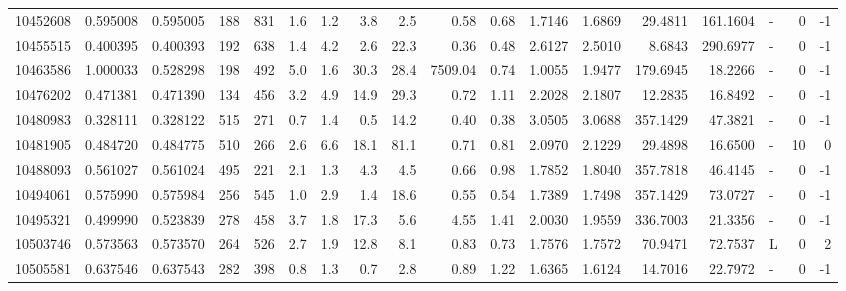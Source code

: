 \begin{tabular}{rrrrrrrrrrrrrrrlrr}
  10452608 & 0.595008 &   0.595005 &  188 &  831 &      1.6 &      1.2 &     3.8 &      2.5 &       0.58 &        0.68 &  1.7146 &  1.6869 &   29.4811 &  161.1604 &             - &        0 &         -1 \\
  10455515 & 0.400395 &   0.400393 &  192 &  638 &      1.4 &      4.2 &     2.6 &     22.3 &       0.36 &        0.48 &  2.6127 &  2.5010 &    8.6843 &  290.6977 &             - &        0 &         -1 \\
  10463586 & 1.000033 &   0.528298 &  198 &  492 &      5.0 &      1.6 &    30.3 &     28.4 &    7509.04 &        0.74 &  1.0055 &  1.9477 &  179.6945 &   18.2266 &             - &        0 &         -1 \\
  10476202 & 0.471381 &   0.471390 &  134 &  456 &      3.2 &      4.9 &    14.9 &     29.3 &       0.72 &        1.11 &  2.2028 &  2.1807 &   12.2835 &   16.8492 &             - &        0 &         -1 \\
  10480983 & 0.328111 &   0.328122 &  515 &  271 &      0.7 &      1.4 &     0.5 &     14.2 &       0.40 &        0.38 &  3.0505 &  3.0688 &  357.1429 &   47.3821 &             - &        0 &         -1 \\
  10481905 & 0.484720 &   0.484775 &  510 &  266 &      2.6 &      6.6 &    18.1 &     81.1 &       0.71 &        0.81 &  2.0970 &  2.1229 &   29.4898 &   16.6500 &             - &       10 &          0 \\
  10488093 & 0.561027 &   0.561024 &  495 &  221 &      2.1 &      1.3 &     4.3 &      4.5 &       0.66 &        0.98 &  1.7852 &  1.8040 &  357.7818 &   46.4145 &             - &        0 &         -1 \\
  10494061 & 0.575990 &   0.575984 &  256 &  545 &      1.0 &      2.9 &     1.4 &     18.6 &       0.55 &        0.54 &  1.7389 &  1.7498 &  357.1429 &   73.0727 &             - &        0 &         -1 \\
  10495321 & 0.499990 &   0.523839 &  278 &  458 &      3.7 &      1.8 &    17.3 &      5.6 &       4.55 &        1.41 &  2.0030 &  1.9559 &  336.7003 &   21.3356 &             - &        0 &         -1 \\
  10503746 & 0.573563 &   0.573570 &  264 &  526 &      2.7 &      1.9 &    12.8 &      8.1 &       0.83 &        0.73 &  1.7576 &  1.7572 &   70.9471 &   72.7537 &             L &        0 &          2 \\
  10505581 & 0.637546 &   0.637543 &  282 &  398 &      0.8 &      1.3 &     0.7 &      2.8 &       0.89 &        1.22 &  1.6365 &  1.6124 &   14.7016 &   22.7972 &             - &        0 &         -1 \\

\end{tabular}
